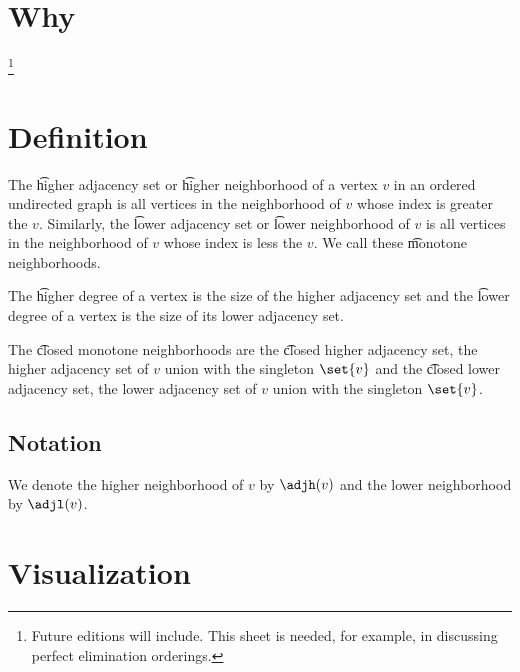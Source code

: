 

\section*{Why}
\footnote{Future editions will include. This sheet is needed, for example, in discussing perfect elimination orderings.}
\section*{Definition}

The \t{higher adjacency set} or \t{higher neighborhood} of a vertex $v$ in an ordered undirected graph is all vertices in the neighborhood of $v$ whose index is greater the $v$.
Similarly, the \t{lower adjacency set} or \t{lower neighborhood} of $v$ is all vertices in the neighborhood of $v$ whose index is less the $v$.
We call these \t{monotone neighborhoods}.

The \t{higher degree} of a vertex is the size of the higher adjacency set and the \t{lower degree} of a vertex is the size of its lower adjacency set.

The \t{closed monotone neighborhoods} are the \t{closed higher adjacency set}, the higher adjacency set of $v$ union with the singleton $\set{v}$ and the \t{closed lower adjacency set}, the lower adjacency set of $v$ union with the singleton $\set{v}$.

\subsection*{Notation}

We denote the higher neighborhood of $v$ by $\adjh(v)$ and the lower neighborhood by $\adjl(v)$.

\section*{Visualization}


